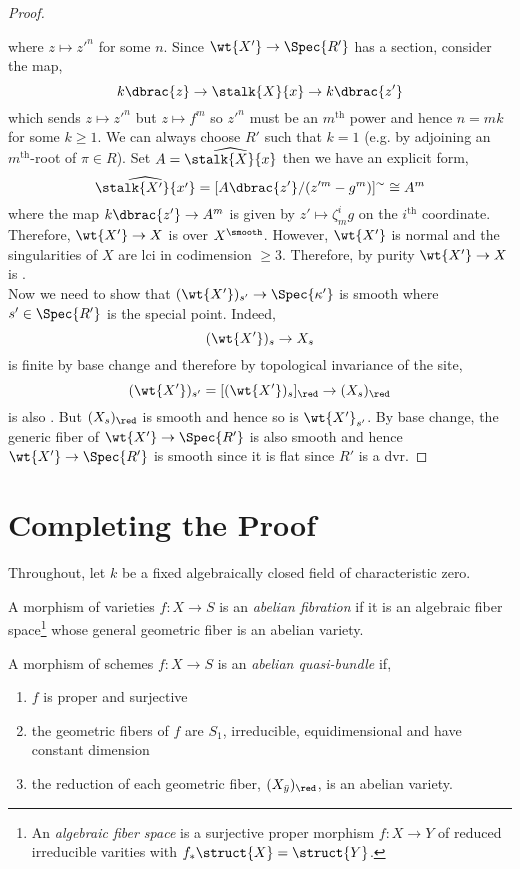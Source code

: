\documentclass[12pt]{article}
\begin{document}
\begin{proof}
\begin{center}
\end{center}
where $z \mapsto z'^n$ for some $n$. Since $\wt{X'} \to \Spec{R'}$ has a section, consider the map,
\[ k\dbrac{z} \to \stalk{X}{x} \to k\dbrac{z'} \]
which sends $z \mapsto z'^n$ but $z \mapsto f^m$ so $z'^n$ must be an $m^{\text{th}}$ power and hence $n = mk$ for some $k \ge 1$. We can always choose $R'$ such that $k = 1$ (e.g. by adjoining an $m^{\text{th}}$-root of $\pi \in R$). Set $A = \widehat{\stalk{X}{x}}$ then we have an explicit form,
\[ \widehat{\stalk{X'}{x'}} = [A \dbrac{z'}/(z'^{m} - g^m)]^{\sim} \cong A^m \]
where the map $k\dbrac{z'} \to A^m$ is given by $z' \mapsto \zeta_m^i g$ on the $i^{\text{th}}$ coordinate. Therefore, $\wt{X'} \to X$ is \etale over $X^{\smooth}$. However, $\wt{X'}$ is normal and the singularities of $X$ are lci in codimension $\ge 3$. Therefore, by purity $\wt{X'} \to X$ is \etale. 
\bigskip\\
Now we need to show that $(\wt{X'})_{s'} \to \Spec{\kappa'}$ is smooth where $s' \in \Spec{R'}$ is the special point. Indeed,
\[ (\wt{X'})_{s} \to X_s \]
is finite \etale by base change and therefore by topological invariance of the \etale site,
\[ (\wt{X'})_{s'} = [(\wt{X'})_{s}]_{\red} \to (X_s)_{\red} \]
is also \etale. But $(X_s)_{\red}$ is smooth and hence so is $\wt{X'}_{s'}$. By base change, the generic fiber of $\wt{X'} \to \Spec{R'}$ is also smooth and hence $\wt{X'} \to \Spec{R'}$ is smooth since it is flat since $R'$ is a dvr.
\end{proof}

\section{Completing the Proof}

Throughout, let $k$ be a fixed algebraically closed field of characteristic zero.

\begin{defn}
A morphism of varieties $f : X \to S$ is an \textit{abelian fibration} if it is an algebraic fiber space\footnote{An \textit{algebraic fiber space} is a surjective proper morphism $f : X \to Y$ of reduced irreducible varities with $f_* \struct{X} = \struct{Y}$.} whose general geometric fiber is an abelian variety. 
\end{defn}

\begin{defn}
A morphism of schemes $f : X \to S$ is an \textit{abelian quasi-bundle} if,
\begin{enumerate}
\item $f$ is proper and surjective
\item the geometric fibers of $f$ are $S_1$, irreducible, equidimensional and have constant dimension
\item the reduction of each geometric fiber, $(X_{\bar{y}})_{\red}$, is an abelian variety. 
\end{enumerate} 
\end{defn}
\end{document}
